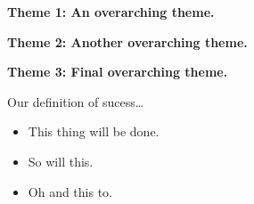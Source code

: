\lipsum[6-7]

\vspace{0.5em}
\noindent
{\bf Theme 1: An overarching theme.}

\vspace{0.5em}
\noindent
{\bf Theme 2: Another overarching theme.}

\vspace{0.5em}
\noindent
{\bf Theme 3: Final overarching theme.}

Our definition of sucess\ldots
\begin{itemize}
    \item This thing will be done.
    \item So will this.
    \item Oh and this to.
\end{itemize}
